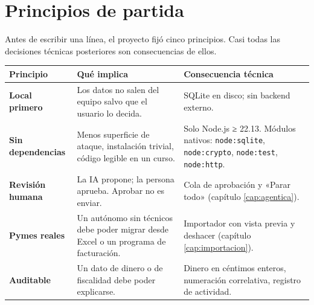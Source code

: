 \chapter{Principios de partida}\label{principios-de-partida}

Antes de escribir una línea, el proyecto fijó cinco principios. Casi todas las decisiones técnicas posteriores son consecuencias de ellos.

{\def\LTcaptype{none} %
\begin{longtable}[]{@{}
  >{\raggedright\arraybackslash}p{}
  >{\raggedright\arraybackslash}p{}
  >{\raggedright\arraybackslash}p{}@{}}
\toprule\noalign{}
\begin{minipage}[b]{\linewidth}\raggedright
Principio
\end{minipage} & \begin{minipage}[b]{\linewidth}\raggedright
Qué implica
\end{minipage} & \begin{minipage}[b]{\linewidth}\raggedright
Consecuencia técnica
\end{minipage} \\
\midrule\noalign{}
\endhead
\bottomrule\noalign{}
\endlastfoot
\textbf{Local primero} & Los datos no salen del equipo salvo que el usuario lo decida. & SQLite en disco; sin backend externo. \\
\textbf{Sin dependencias} & Menos superficie de ataque, instalación trivial, código legible en un curso. & Solo Node.js ≥ 22.13. Módulos nativos: \texttt{node:sqlite}, \texttt{node:crypto}, \texttt{node:test}, \texttt{node:http}. \\
\textbf{Revisión humana} & La IA propone; la persona aprueba. Aprobar no es enviar. & Cola de aprobación y «Parar todo» (capítulo \ref{cap:agentica}). \\
\textbf{Pymes reales} & Un autónomo sin técnicos debe poder migrar desde Excel o un programa de facturación. & Importador con vista previa y deshacer (capítulo \ref{cap:importacion}). \\
\textbf{Auditable} & Un dato de dinero o de fiscalidad debe poder explicarse. & Dinero en céntimos enteros, numeración correlativa, registro de actividad. \\
\end{longtable}
}

